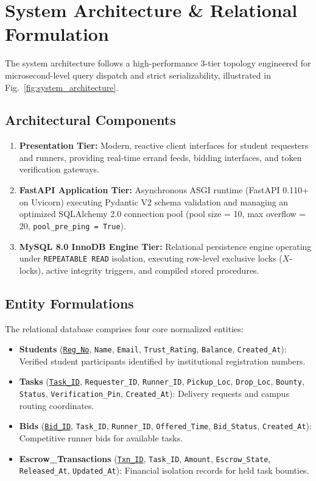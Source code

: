 \documentclass[conference]{IEEEtran}
\begin{document}
\section{System Architecture \& Relational Formulation}
The system architecture follows a high-performance 3-tier topology engineered for microsecond-level query dispatch and strict serializability, illustrated in Fig.~\ref{fig:system_architecture}.

\subsection{Architectural Components}
\begin{enumerate}
    \item \textbf{Presentation Tier:} Modern, reactive client interfaces for student requesters and runners, providing real-time errand feeds, bidding interfaces, and token verification gateways.
    \item \textbf{FastAPI Application Tier:} Asynchronous ASGI runtime (FastAPI 0.110+ on Uvicorn) executing Pydantic V2 schema validation and managing an optimized SQLAlchemy 2.0 connection pool (pool size = 10, max overflow = 20, \texttt{pool\_pre\_ping = True}).
    \item \textbf{MySQL 8.0 InnoDB Engine Tier:} Relational persistence engine operating under \texttt{REPEATABLE READ} isolation, executing row-level exclusive locks ($X$-locks), active integrity triggers, and compiled stored procedures.
\end{enumerate}

\subsection{Entity Formulations}
The relational database comprises four core normalized entities:
\begin{itemize}
    \item \textbf{Students} (\underline{\texttt{Reg\_No}}, \texttt{Name}, \texttt{Email}, \texttt{Trust\_Rating}, \texttt{Balance}, \texttt{Created\_At}): Verified student participants identified by institutional registration numbers.
    \item \textbf{Tasks} (\underline{\texttt{Task\_ID}}, \texttt{Requester\_ID}, \texttt{Runner\_ID}, \texttt{Pickup\_Loc}, \texttt{Drop\_Loc}, \texttt{Bounty}, \texttt{Status}, \texttt{Verification\_Pin}, \texttt{Created\_At}): Delivery requests and campus routing coordinates.
    \item \textbf{Bids} (\underline{\texttt{Bid\_ID}}, \texttt{Task\_ID}, \texttt{Runner\_ID}, \texttt{Offered\_Time}, \texttt{Bid\_Status}, \texttt{Created\_At}): Competitive runner bids for available tasks.
    \item \textbf{Escrow\_Transactions} (\underline{\texttt{Txn\_ID}}, \texttt{Task\_ID}, \texttt{Amount}, \texttt{Escrow\_State}, \texttt{Released\_At}, \texttt{Updated\_At}): Financial isolation records for held task bounties.
\end{itemize}
\end{document}
